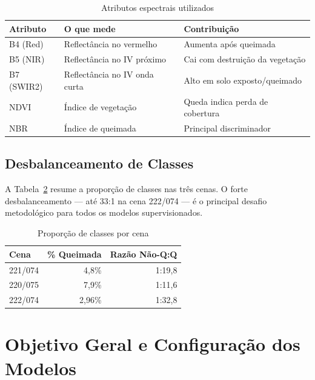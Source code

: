 \documentclass[conference]{IEEEtran}
\begin{document}
\begin{table}[!t]
  \caption{Atributos espectrais utilizados}
  \label{tab:features_geral}
  \centering
  \begin{tabular}{lll}
    \toprule
    \textbf{Atributo} & \textbf{O que mede} & \textbf{Contribuição} \\
    \midrule
    B4 (Red)   & Reflectância no vermelho       & Aumenta após queimada \\
    B5 (NIR)   & Reflectância no IV próximo     & Cai com destruição da vegetação \\
    B7 (SWIR2) & Reflectância no IV onda curta  & Alto em solo exposto/queimado \\
    NDVI       & Índice de vegetação            & Queda indica perda de cobertura \\
    NBR        & Índice de queimada             & Principal discriminador \\
    \bottomrule
  \end{tabular}
\end{table}

\subsection{Desbalanceamento de Classes}

A Tabela~\ref{tab:imbalance_geral} resume a proporção de classes nas três
cenas. O forte desbalanceamento — até 33:1 na cena 222/074 — é o principal
desafio metodológico para todos os modelos supervisionados.

\begin{table}[!t]
  \caption{Proporção de classes por cena}
  \label{tab:imbalance_geral}
  \centering
  \begin{tabular}{lrr}
    \toprule
    \textbf{Cena} & \textbf{\% Queimada} & \textbf{Razão Não-Q:Q} \\
    \midrule
    221/074 & 4,8\%  & 1:19,8 \\
    220/075 & 7,9\%  & 1:11,6 \\
    222/074 & 2,96\% & 1:32,8 \\
    \bottomrule
  \end{tabular}
\end{table}

\section{Objetivo Geral e Configuração dos Modelos}
\end{document}

